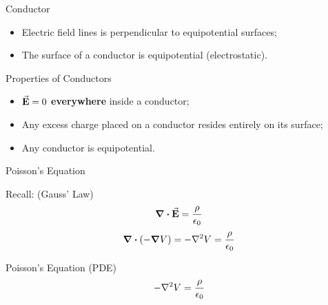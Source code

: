 \documentclass{beamer}
\begin{document}
\begin{frame}{Conductor}
    \begin{itemize}
        \item Electric field lines is perpendicular to equipotential surfaces;
        \item The surface of a conductor is equipotential (electrostatic).
    \end{itemize}
    \vspace{1em}
    \begin{beamerboxesrounded}[shadow=true]{Properties of Conductors}
        \begin{itemize}
            \item $\va{E} = 0$ \textbf{everywhere} inside a conductor;
            \item Any excess charge placed on a conductor resides entirely on its surface;
            \item Any conductor is equipotential.
        \end{itemize}
    \end{beamerboxesrounded}
\end{frame}


\begin{frame}{Poisson's Equation}
    \begin{block}{Recall: (Gauss' Law)}
        \begin{equation}
            \div{\va{E}} = \frac{\rho}{\epsilon_0}
        \end{equation}  
        \begin{equation}
            \div(-\grad{V}) = -\laplacian{V} = \frac{\rho}{\epsilon_0}
        \end{equation}
    \end{block}

    \begin{block}{Poisson's Equation (PDE)}
        \begin{equation}
            - \laplacian{V} = \frac{\rho}{\epsilon_0}
        \end{equation}
    \end{block}
\end{frame}
\end{document}
